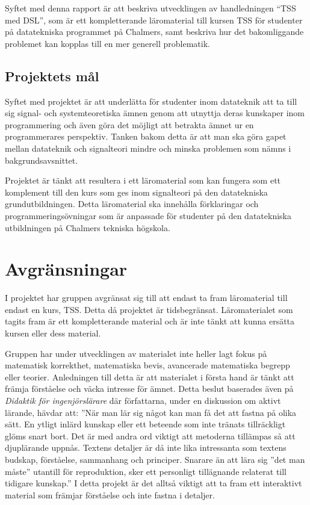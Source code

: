 \documentclass[]{article}
\begin{document}

Syftet med denna rapport är att beskriva utvecklingen av handledningen
``TSS med DSL'', som är ett kompletterande läromaterial till kursen TSS
för studenter på datatekniska programmet på Chalmers,
samt beskriva hur det bakomliggande problemet kan kopplas till en mer
generell problematik.

\subsection{Projektets mål}
Syftet med projektet är att underlätta för studenter inom datateknik att
ta till sig signal- och systemteoretiska ämnen genom att utnyttja deras
kunskaper inom programmering och även göra det möjligt att betrakta ämnet ur
en programmerares perspektiv. Tanken bakom detta är att man ska göra gapet
mellan datateknik och signalteori mindre och minska problemen som nämns
i bakgrundsavsnittet.

Projektet är tänkt att resultera i ett läromaterial som kan fungera som ett
komplement till den kurs som ges inom signalteori på den datatekniska
grundutbildningen. Detta läromaterial ska innehålla förklaringar och
programmeringsövningar som är anpassade för studenter på den datatekniska
utbildningen på Chalmers tekniska högskola.

\section{Avgränsningar}

I projektet har gruppen avgränsat sig till att endast ta fram läromaterial
till endast en kurs, TSS. Detta då projektet är tidsbegränsat.
Läromaterialet som tagits fram är ett kompletterande material och är inte
tänkt att kunna ersätta kursen eller dess material.

Gruppen har under utvecklingen av materialet inte heller lagt fokus på matematisk korrekthet,
matematiska bevis, avancerade matematiska begrepp eller teorier.  Anledningen till detta är att
materialet  i första hand är tänkt att främja förståelse och väcka intresse för ämnet. Detta beslut
baserades även på \textit{Didaktik för ingenjörslärare} där författarna, under en diskussion om aktivt lärande,
hävdar att: ”När man lär sig något kan man få det att fastna på olika sätt. En ytligt inlärd kunskap
eller ett beteende som inte tränats tillräckligt glöms snart bort. Det är med andra ord viktigt att
metoderna tillämpas så att djuplärande uppnås. Textens detaljer är då inte lika intressanta som textens
budskap, förståelse, sammanhang och principer. Snarare än att lära sig ”det man måste” utantill för
reproduktion, sker ett personligt tillägnande relaterat till tidigare kunskap.” I detta projekt är det
alltså viktigt att ta fram ett interaktivt material som främjar förståelse och inte fastna i detaljer.
\end{document}
